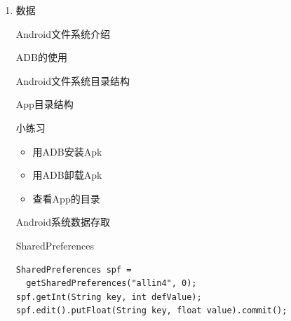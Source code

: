 \documentclass[presentation,dvipdfmx,CJKbookmarks]{beamer}
\begin{document}
\begin{CJK*}{UTF8}{simsun}
\begin{enumerate}
\begin{frame}[label={sec:org4427f39}]{WebView应用}
\begin{block}{微博、微信客户端等的网页（网络应用）}
\end{block}
\begin{block}{CrossDict的实现（离线网页应用）}
\end{block}
\end{frame}

\item 数据
\label{sec:org678f738}
\begin{frame}[label={sec:org769e8a7}]{Android文件系统介绍}
\begin{block}{ADB的使用}
\end{block}
\begin{block}{Android文件系统目录结构}
\end{block}
\begin{block}{App目录结构}
\end{block}
\end{frame}

\begin{frame}[label={sec:org3757fe6}]{小练习}
\begin{itemize}
\item 用ADB安装Apk
\item 用ADB卸载Apk
\item 查看App的目录
\end{itemize}
\end{frame}

\begin{frame}[fragile,label={sec:org1602a59}]{Android系统数据存取}
 \begin{block}{SharedPreferences}
\begin{verbatim}
SharedPreferences spf =
  getSharedPreferences("allin4", 0);
spf.getInt(String key, int defValue);
spf.edit().putFloat(String key, float value).commit();
\end{verbatim}
\end{block}


\end{frame}
\end{enumerate}
\end{CJK*}
\end{document}
